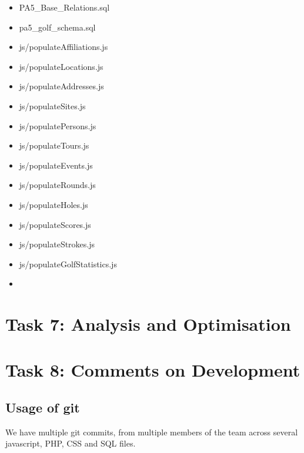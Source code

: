 \documentclass[titlepage]{article}
\begin{document}
\begin{itemize}
  \item PA5\_Base\_Relations.sql
  \item pa5\_golf\_schema.sql
  \item js/populateAffiliations.js
  \item js/populateLocations.js
  \item js/populateAddresses.js 
  \item js/populateSites.js 
  \item js/populatePersons.js 
  \item js/populateTours.js 
  \item js/populateEvents.js 
  \item js/populateRounds.js 
  \item js/populateHoles.js 
  \item js/populateScores.js 
  \item js/populateStrokes.js 
  \item js/populateGolfStatistics.js 
  \item 
\end{itemize}
\newpage



\section{Task 7: Analysis and Optimisation}
\newpage


\section{Task 8: Comments on Development}

\subsection{Usage of git}
We have multiple git commits, from multiple members of the team across several javascript, PHP, CSS and SQL files.
\end{document}
